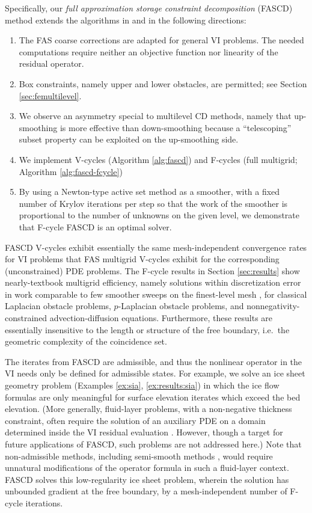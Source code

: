 \documentclass[letterpaper,final,12pt,reqno]{amsart}
\theoremstyle{cstyle}
\theoremstyle{cstyle*}
\theoremstyle{dstyle}
\numberwithin{equation}{section}
\numberwithin{figure}{section}
\numberwithin{table}{section}
\numberwithin{theorem}{section}
\begin{document}
Specifically, our \emph{full approximation storage constraint decomposition} (FASCD) method extends the algorithms in \cite{GraeserKornhuber2009} and \cite{Tai2003} in the following directions:
\renewcommand{\labelenumi}{\emph{(\roman{enumi})}}
\begin{enumerate}
\item The FAS coarse corrections are adapted for general VI problems.  The needed computations require neither an objective function nor linearity of the residual operator.
\item Box constraints, namely upper and lower obstacles, are permitted; see Section \ref{sec:femultilevel}.
\item We observe an asymmetry special to multilevel CD methods, namely that up-smoothing is more effective than down-smoothing because a ``telescoping'' subset property can be exploited on the up-smoothing side.
\item We implement V-cycles (Algorithm \ref{alg:fascd}) and F-cycles (full multigrid; Algorithm \ref{alg:fascd-fcycle})
\item By using a Newton-type active set method as a smoother, with a fixed number of Krylov iterations per step so that the work of the smoother is proportional to the number of unknowns on the given level, we demonstrate that F-cycle FASCD is an optimal solver.
\end{enumerate}

FASCD V-cycles exhibit essentially the same mesh-independent convergence rates for VI problems that FAS multigrid V-cycles exhibit for the corresponding (unconstrained) PDE problems.  The F-cycle results in Section \ref{sec:results} show nearly-textbook multigrid efficiency, namely solutions within discretization error in work comparable to few smoother sweeps on the finest-level mesh \cite{BrandtLivne2011}, for classical Laplacian obstacle problems, $p$-Laplacian obstacle problems, and nonnegativity-constrained advection-diffusion equations.  Furthermore, these results are essentially insensitive to the length or structure of the free boundary, i.e.~the geometric complexity of the coincidence set.

The iterates from FASCD are admissible, and thus the nonlinear operator in the VI needs only be defined for admissible states.  For example, we solve an ice sheet geometry problem (Examples \ref{ex:sia}, \ref{ex:results:sia}) in which the ice flow formulas are only meaningful for surface elevation iterates which exceed the bed elevation.  (More generally, fluid-layer problems, with a non-negative thickness constraint, often require the solution of an auxiliary PDE on a domain determined inside the VI residual evaluation \cite{Bueler2021conservation}.  However, though a target for future applications of FASCD, such problems are not addressed here.)  Note that non-admissible methods, including semi-smooth methods \cite{BensonMunson2006}, would require unnatural modifications of the operator formula in such a fluid-layer context.  FASCD solves this low-regularity ice sheet problem, wherein the solution has unbounded gradient at the free boundary, by a mesh-independent number of F-cycle iterations.
\end{document}
